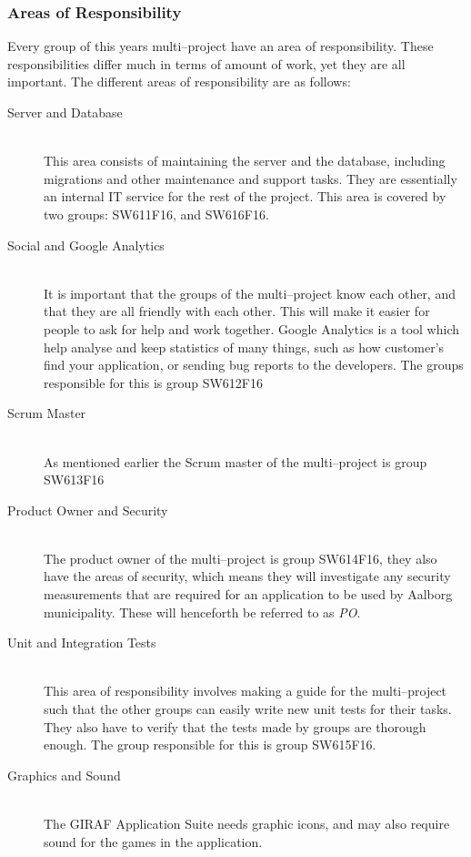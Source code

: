 \subsubsection*{Areas of Responsibility}
Every group of this years multi--project have an area of responsibility.
These responsibilities differ much in terms of amount of work, yet they are all important.
The different areas of responsibility are as follows:

\begin{description}
	\item[Server and Database] \hfill \\
	This area consists of maintaining the server and the database, including migrations and other maintenance and support tasks. They are essentially an internal IT service for the rest of the project. This area is covered by two groups: SW611F16, and SW616F16.
	\item[Social and Google Analytics] \hfill \\
	It is important that the groups of the multi--project know each other, and that they are all friendly with each other.
	This will make it easier for people to ask for help and work together.
	Google Analytics is a tool which help analyse and keep statistics of many things, such as how customer's find your application, or sending bug reports to the developers.
	The groups responsible for this is group SW612F16
	\item[Scrum Master] \hfill \\
	As mentioned earlier the Scrum master of the multi--project is group SW613F16
	\item[Product Owner and Security] \hfill \\
	The product owner of the multi--project is group SW614F16, they also have the areas of security, which means they will investigate any security measurements that are required for an application to be used by Aalborg municipality.
    These will henceforth be referred to as \textit{PO}.
	\item[Unit and Integration Tests] \hfill \\
	This area of responsibility involves making a guide for the multi--project such that the other groups can easily write new unit tests for their tasks.
	They also have to verify that the tests made by groups are thorough enough.
	The group responsible for this is group SW615F16.
	\item[Graphics and Sound] \hfill \\
	The GIRAF Application Suite needs graphic icons, and may also require sound for the games in the application.

\end{description}
